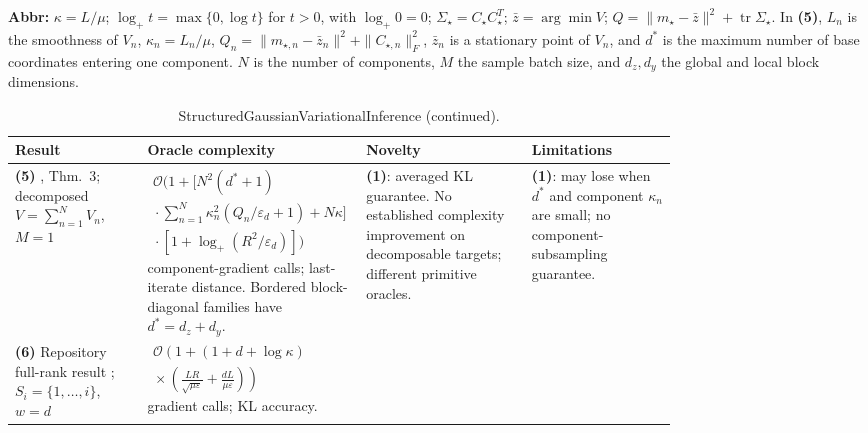 \begin{table}[tp]
\begin{threeparttable}
\begin{tablenotes}[flushleft]
\item[] \textbf{Abbr:} $\kappa=L/\mu$; $\log_+t=\max\{0,\log t\}$ for $t>0$, with $\log_+0=0$; $\Sigma_\star=C_\star C_\star^T$; $\bar z=\arg\min V$; $Q=\|m_\star-\bar z\|^2+\operatorname{tr}\Sigma_\star$. In \textbf{(5)}, $L_n$ is the smoothness of $V_n$, $\kappa_n=L_n/\mu$, $Q_n=\|m_{\star,n}-\bar z_n\|^2+\|C_{\star,n}\|_F^2$, $\bar z_n$ is a stationary point of $V_n$, and $d^*$ is the maximum number of base coordinates entering one component. $N$ is the number of components, $M$ the sample batch size, and $d_z,d_y$ the global and local block dimensions.
\end{tablenotes}
\end{threeparttable}
\end{table}
\clearpage
\begin{table}[tp]
\centering
\caption{StructuredGaussianVariationalInference (continued).}
\begin{threeparttable}
\footnotesize
\setlength{\tabcolsep}{4pt}\renewcommand{\arraystretch}{1.25}
\begin{tabularx}{\linewidth}{@{}>{\raggedright\arraybackslash}p{0.20\linewidth}>{\raggedright\arraybackslash}p{0.32\linewidth}>{\raggedright\arraybackslash}p{0.25\linewidth}>{\raggedright\arraybackslash}X@{}}
\toprule
\textbf{Result} & \textbf{Oracle complexity} & \textbf{Novelty} & \textbf{Limitations} \\
\midrule
\textbf{(5)} \citep{sgviKo2025v4Verified}, Thm.~3; decomposed $V=\sum_{n=1}^N V_n$, $M=1$
& $\displaystyle\begin{gathered}\mathcal{O}\!\biggl(1+\biggl[N^2(d^*+1)\\ {}\cdot\sum_{n=1}^N\kappa_n^2(Q_n/\varepsilon_d+1)+N\kappa\biggr]\\ {}\cdot[1+\log_+(R^2/\varepsilon_d)]\biggr)\end{gathered}$ component-gradient calls; last-iterate distance. Bordered block-diagonal families have $d^*=d_z+d_y$.
& \textbf{(1)}: averaged KL guarantee. No established complexity improvement on decomposable targets; different primitive oracles.
& \textbf{(1)}: may lose when $d^*$ and component $\kappa_n$ are small; no component-subsampling guarantee. \\
\midrule
\textbf{(6)} Repository full-rank result \citep{sgviRepository2026Verified}; $S_i=\{1,\ldots,i\}$, $w=d$
& $\displaystyle\begin{gathered}\mathcal{O}\!\left(1+(1+d+\log\kappa)\right.\\[-2pt]\left.{}\times\left(\frac{LR}{\sqrt{\mu\varepsilon}}+\frac{dL}{\mu\varepsilon}\right)\right)\end{gathered}$ gradient calls; KL accuracy.

\end{tabularx}
\end{threeparttable}
\end{table}
